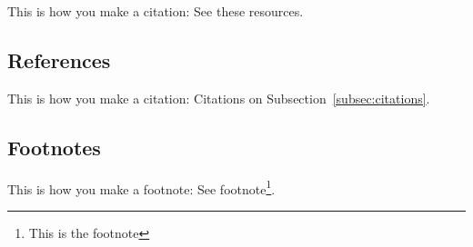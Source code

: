 \documentclass{article}
\begin{document}
This is how you make a citation: See these resources\cite{wiki:latex, slides}.

\subsection{References}\label{subsec:references}

This is how you make a citation: Citations on Subsection~\ref{subsec:citations}.

\subsection{Footnotes}\label{subsec:footnotes}

This is how you make a footnote: See footnote\footnote{This is the footnote}.



\end{document}
